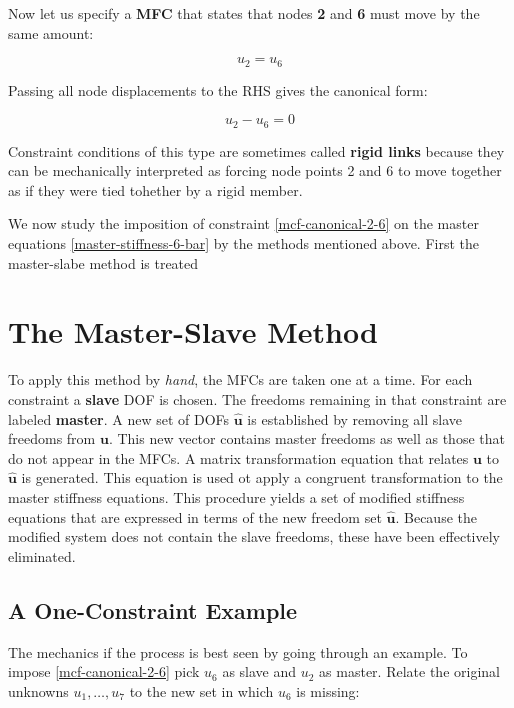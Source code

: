 \documentclass[10pt,b5paper,titlepage]{book}
\newcommand{\m}{\mathbf}
\begin{document}
Now let us specify a \textbf{MFC} that states that nodes \textbf{2} and \textbf{6}
must move by the same amount:

\begin{equation}\label{mfc-2-6}
    u_2 = u_6
\end{equation}

Passing all node displacements to the RHS gives the canonical form:

\begin{equation}\label{mcf-canonical-2-6}
    u_2 - u_6 = 0
\end{equation}

Constraint conditions of this type are sometimes called \textbf{rigid links}
because they can be mechanically interpreted as forcing node points 2 and 6
to move together as if they were tied tohether by a rigid member.

We now study the imposition of constraint \eqref{mcf-canonical-2-6} on the master equations
\eqref{master-stiffness-6-bar} by the methods mentioned above. First the master-slabe
method is treated

\section{The Master-Slave Method}

To apply this method by \textit{hand}, the MFCs are taken one at a time. For each
constraint a \textbf{slave} DOF is chosen. The freedoms remaining in that constraint
are labeled \textbf{master}. A new set of DOFs $ \m{\hat{u}} $ is established
by removing all slave freedoms from $ \m{u} $. This new vector contains
master freedoms as well as those that do not appear in the MFCs. A matrix transformation
equation that relates $ \m{u} $ to $ \m{\hat{u}} $ is generated. This
equation is used ot apply a congruent transformation to the master stiffness equations.
This procedure yields a set of modified stiffness equations that are expressed in terms
of the new freedom set $ \m{\hat{u}} $. Because the modified system does not contain
the slave freedoms, these have been effectively eliminated.

\subsection{A One-Constraint Example}

The mechanics if the process is best seen by going through an example. To impose
\eqref{mcf-canonical-2-6} pick $ u_6 $ as slave and $ u_2 $ as master. Relate the
original unknowns $ u_1, \dots, u_7 $ to the new set in which $ u_6 $ is missing:
\end{document}
